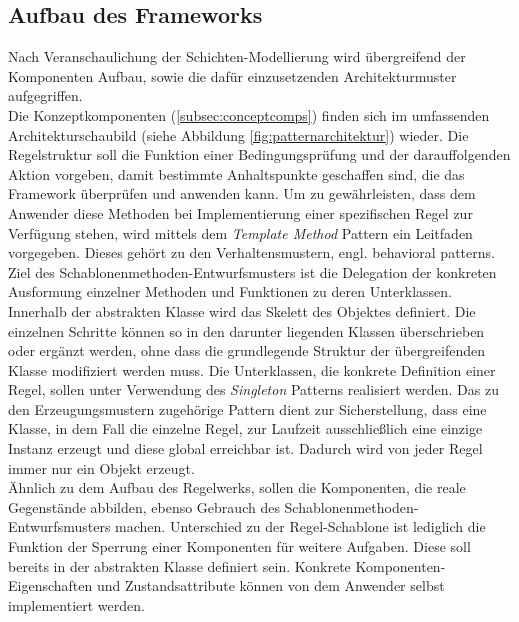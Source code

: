     \subsection{Aufbau des Frameworks}
        Nach Veranschaulichung der Schichten-Modellierung wird übergreifend der Komponenten Aufbau, sowie die dafür einzusetzenden Architekturmuster aufgegriffen. 
        \\
        Die Konzeptkomponenten (\ref{subsec:conceptcomps}) finden sich im umfassenden Architekturschaubild (siehe Abbildung \ref{fig:patternarchitektur}) wieder. 
        Die Regelstruktur 
        soll die Funktion einer Bedingungsprüfung und der darauffolgenden Aktion vorgeben, damit bestimmte Anhaltspunkte geschaffen sind, die das Framework überprüfen 
        und anwenden kann. Um zu gewährleisten, dass dem Anwender diese Methoden bei Implementierung einer spezifischen Regel zur Verfügung stehen, wird mittels dem 
        \textit{Template Method} Pattern \cite{gamma1995template} ein Leitfaden vorgegeben. Dieses gehört zu den Verhaltensmustern, engl. behavioral patterns. 
        Ziel des Schablonenmethoden-Entwurfsmusters ist die Delegation der konkreten Ausformung einzelner Methoden und Funktionen zu deren Unterklassen. Innerhalb der 
        abstrakten Klasse wird das Skelett des Objektes definiert. Die einzelnen Schritte können so in den darunter liegenden Klassen überschrieben oder ergänzt 
        werden, ohne dass die grundlegende Struktur der übergreifenden Klasse modifiziert werden muss. Die Unterklassen, die konkrete Definition einer Regel, sollen 
        unter Verwendung des \textit{Singleton} Patterns \cite{gamma1995singleton} realisiert werden. Das zu den Erzeugungsmustern 
        zugehörige Pattern dient zur 
        Sicherstellung, dass eine Klasse, in dem Fall die einzelne Regel, zur Laufzeit ausschließlich eine einzige Instanz erzeugt und diese global erreichbar ist. 
        Dadurch wird von jeder Regel immer nur ein Objekt erzeugt. 
        \\
        \linebreak
        Ähnlich zu dem Aufbau des Regelwerks, sollen die Komponenten, die reale Gegenstände abbilden, ebenso Gebrauch des Schablonenmethoden-Entwurfsmusters machen. 
        Unterschied zu der Regel-Schablone ist lediglich die Funktion der Sperrung einer Komponenten für weitere Aufgaben. Diese soll bereits in der abstrakten Klasse 
        definiert sein. Konkrete Komponenten-Eigenschaften und Zustandsattribute können von dem Anwender selbst implementiert werden.
        \\
